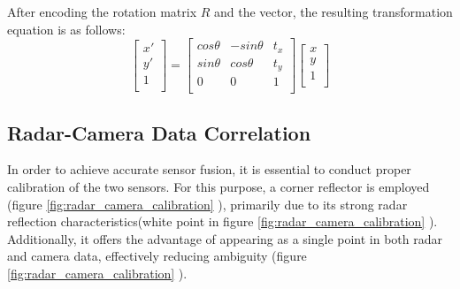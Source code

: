 After encoding the rotation matrix $R$ and the vector, the resulting transformation equation is as follows:
\begin{equation}\label{equ:2d_trans_eq}
    \begin{bmatrix}
        x'\\ 
        y'\\
        1\\
    \end{bmatrix}=
    \begin{bmatrix}
    cos\theta & -sin\theta & t_x\\
    sin\theta & cos\theta & t_y\\
    0 & 0 & 1\\
    \end{bmatrix}
    \begin{bmatrix}
        x\\ 
        y\\
        1\\
    \end{bmatrix}
\end{equation}

\newpage
\subsection{Radar-Camera Data Correlation}
In order to achieve accurate sensor fusion, it is essential to conduct proper calibration of the two sensors. 
For this purpose, a corner reflector is employed (figure \ref*{fig:radar_camera_calibration} ), primarily due to its strong radar reflection characteristics(white point in figure \ref*{fig:radar_camera_calibration} ). 
Additionally, it offers the advantage of appearing as a single point in both radar and camera data, effectively reducing ambiguity (figure \ref*{fig:radar_camera_calibration} ).
